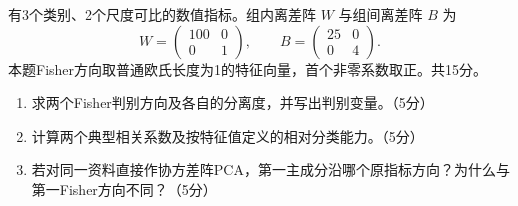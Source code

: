 \par\addvspace{6pt}\noindent\begin{minipage}{\linewidth}


有3个类别、2个尺度可比的数值指标。组内离差阵 \(W\) 与组间离差阵 \(B\) 为 \[W=\begin{pmatrix}100&0\\0&1\end{pmatrix},\qquad
B=\begin{pmatrix}25&0\\0&4\end{pmatrix}.\] 本题Fisher方向取普通欧氏长度为1的特征向量，首个非零系数取正。共15分。

\begin{enumerate}
\def\labelenumi{\arabic{enumi}.}
\tightlist
\item
  求两个Fisher判别方向及各自的分离度，并写出判别变量。（5分）
\item
  计算两个典型相关系数及按特征值定义的相对分类能力。（5分）
\item
  若对同一资料直接作协方差阵PCA，第一主成分沿哪个原指标方向？为什么与第一Fisher方向不同？（5分）
\end{enumerate}



\end{minipage}\par\vspace{4pt}

